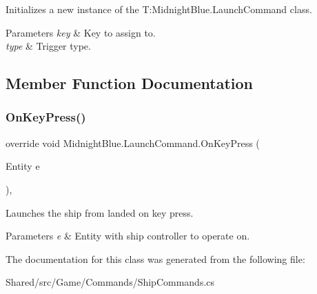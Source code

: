 Initializes a new instance of the T\+:\+Midnight\+Blue.\+Launch\+Command class. 


\begin{DoxyParams}{Parameters}
{\em key} & Key to assign to.\\
\hline
{\em type} & Trigger type.\\
\hline
\end{DoxyParams}


\subsection{Member Function Documentation}
\hypertarget{class_midnight_blue_1_1_launch_command_a5da2fdd898111ea59f4f63126c380a3e}{}\label{class_midnight_blue_1_1_launch_command_a5da2fdd898111ea59f4f63126c380a3e} 
\subsubsection{\texorpdfstring{On\+Key\+Press()}{OnKeyPress()}}
{\footnotesize\ttfamily override void Midnight\+Blue.\+Launch\+Command.\+On\+Key\+Press (\begin{DoxyParamCaption}\item[{Entity}]{e }\end{DoxyParamCaption})\hspace{0.3cm}{\ttfamily [inline]}, {\ttfamily [protected]}}



Launches the ship from landed on key press. 


\begin{DoxyParams}{Parameters}
{\em e} & Entity with ship controller to operate on.\\
\hline
\end{DoxyParams}


The documentation for this class was generated from the following file\+:\begin{DoxyCompactItemize}
\item 
Shared/src/\+Game/\+Commands/Ship\+Commands.\+cs\end{DoxyCompactItemize}
